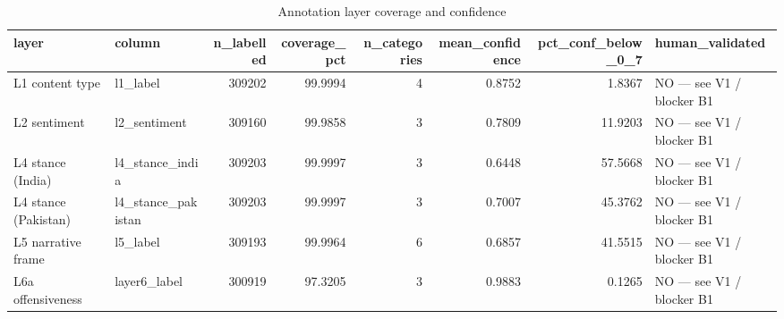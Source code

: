 \begin{table}
\caption{Annotation layer coverage and confidence}
\label{tab:r1r2_annotation_audit}
\begin{tabular}{llrrrrrl}
\toprule
layer & column & n\_labelled & coverage\_pct & n\_categories & mean\_confidence & pct\_conf\_below\_0\_7 & human\_validated \\
\midrule
L1 content type & l1\_label & 309202 & 99.9994 & 4 & 0.8752 & 1.8367 & NO — see V1 / blocker B1 \\
L2 sentiment & l2\_sentiment & 309160 & 99.9858 & 3 & 0.7809 & 11.9203 & NO — see V1 / blocker B1 \\
L4 stance (India) & l4\_stance\_india & 309203 & 99.9997 & 3 & 0.6448 & 57.5668 & NO — see V1 / blocker B1 \\
L4 stance (Pakistan) & l4\_stance\_pakistan & 309203 & 99.9997 & 3 & 0.7007 & 45.3762 & NO — see V1 / blocker B1 \\
L5 narrative frame & l5\_label & 309193 & 99.9964 & 6 & 0.6857 & 41.5515 & NO — see V1 / blocker B1 \\
L6a offensiveness & layer6\_label & 300919 & 97.3205 & 3 & 0.9883 & 0.1265 & NO — see V1 / blocker B1 \\
\bottomrule
\end{tabular}
\end{table}
